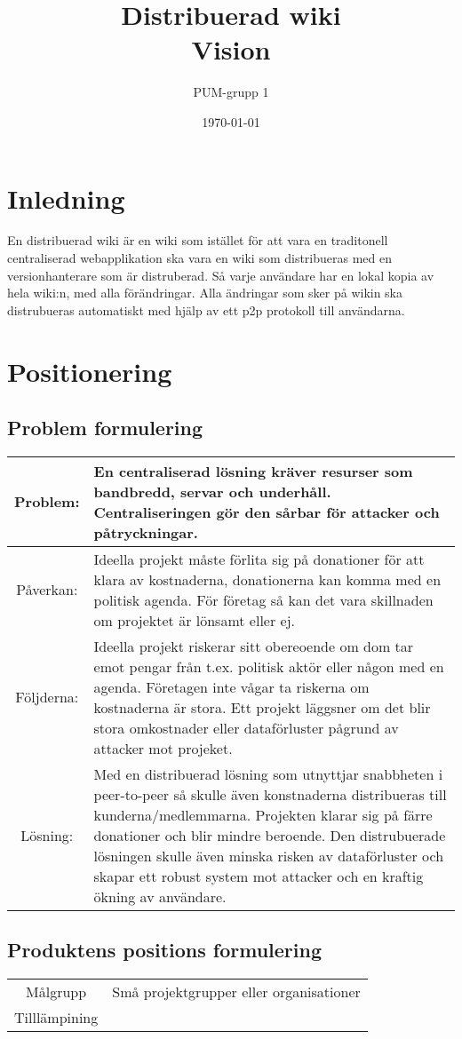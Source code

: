 

\ifpdf
\else
\fi

\title{Distribuerad wiki \\ Vision}
\author{PUM-grupp 1}
\date{\today}



\maketitle

\thispagestyle{empty}
\newpage
\section{Inledning}
En distribuerad wiki är en wiki som istället för att vara en traditonell centraliserad webapplikation ska vara en wiki som distribueras med en versionhanterare som är distruberad. Så varje användare har en lokal kopia av hela wiki:n, med alla förändringar. Alla ändringar som sker på wikin ska distrubueras automatiskt med hjälp av ett p2p protokoll till användarna. 
\section{Positionering}


\subsection{Problem formulering}
\begin{tabular}{|c|m{15 cm}|}
\hline
Problem: & En centraliserad lösning kräver resurser som bandbredd, servar och underhåll. Centraliseringen gör den sårbar för attacker och påtryckningar. \\
\hline
Påverkan: & Ideella projekt måste förlita sig på donationer för att klara av kostnaderna,  donationerna kan komma med en politisk agenda. För företag så kan det vara skillnaden om projektet är lönsamt eller ej.   \\
\hline
Följderna: & Ideella projekt riskerar sitt obereoende om dom tar emot pengar från t.ex. politisk aktör eller någon med en agenda. Företagen inte vågar ta riskerna om kostnaderna är stora. Ett projekt läggsner om det blir stora omkostnader eller dataförluster pågrund av attacker mot projeket. \\
\hline
Lösning: & Med en distribuerad lösning som utnyttjar snabbheten i peer-to-peer så skulle även konstnaderna distribueras till kunderna/medlemmarna. Projekten klarar sig på färre donationer och blir mindre beroende. Den distrubuerade lösningen skulle även minska risken av dataförluster och skapar ett robust system mot attacker och en kraftig ökning av användare. \\
\hline
\end{tabular}

\subsection{Produktens positions formulering} %
\begin{tabular}{|c|m{15 cm}|}
\hline
Målgrupp & Små projektgrupper eller organisationer\\
Tilllämpining 

\end{tabular}

